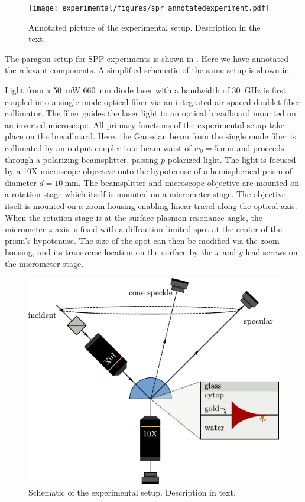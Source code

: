 \begin{figure}[ht]
 \centering
 \texttt{[image: experimental/figures/spr\_annotatedexperiment.pdf]}
 \caption{Annotated picture of the experimental setup.  Description in the
	text.}
 \label{fig:experimentalpicture}
\end{figure}

The paragon setup for SPP experiments is shown in
.  Here we have annotated the relevant
components.  A simplified schematic of the same setup is shown in
.

Light from a \SI{50}{\milli\watt} \SI{660}{\nano\meter} diode laser with a
bandwidth of \SI{30}{\giga\hertz} is first coupled into a single mode
optical fiber via an integrated air-spaced doublet fiber collimator.  The
fiber guides the laser light to an optical breadboard mounted on an
inverted microscope.  All primary functions of the experimental setup take
place on the breadboard.  Here, the Gaussian beam from the single mode
fiber is collimated by an output coupler to a beam waist of
$w_0=\SI{5}{\milli\meter}$ and proceeds through a polarizing beamsplitter,
passing $p$ polarized light.  The light is focused by a 10X microscope
objective onto the hypotenuse of a hemispherical prism of diameter
$d=\SI{10}{\milli\meter}$.  The beamsplitter and microscope objective are
mounted on a rotation stage which itself is mounted on a micrometer stage.
The objective itself is mounted on a zoom housing enabling linear travel
along the optical axis.  When the rotation stage is at the surface plasmon
resonance angle, the micrometer $z$ axis is fixed with a diffraction
limited spot at the center of the prism's hypotenuse.  The size of the spot
can then be modified via the zoom housing, and its transverse location on
the surface by the $x$ and $y$ lead screws on the micrometer stage.  
\begin{figure}[ht]
\centering
 \includegraphics[keepaspectratio]{experimental/figures/conefig.pdf}
 \caption{Schematic of the experimental setup.  Description in text.}
 \label{fig:experimentalsetup}
\end{figure}

